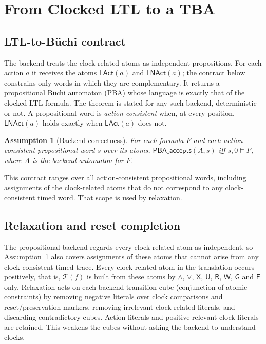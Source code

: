 \documentclass{ieeeaccess}
\newtheorem{assumption}[theorem]{Assumption}
\newcommand{\Until}{\mathbin{\mathsf{U}}}
\newcommand{\Release}{\mathbin{\mathsf{R}}}
\newcommand{\Next}{\mathsf{X}}
\newcommand{\Always}{\mathsf{G}}
\newcommand{\Eventually}{\mathsf{F}}
\newcommand{\WeakUntil}{\mathbin{\mathsf{W}}}
\newcommand{\T}{\mathcal{T}}
\begin{document}
\section{From Clocked LTL to a TBA}
\label{sec:tba-construction}
\subsection{LTL-to-B\"uchi contract}
The backend treats the clock-related atoms as independent propositions.
For each action $a$ it receives the atoms $\mathsf{LAct}(a)$ and
$\mathsf{LNAct}(a)$; the contract below constrains only words in which they
are complementary. It returns a propositional B\"uchi automaton
(PBA) whose language is exactly that of the clocked-LTL formula. The theorem is
stated for any such backend, deterministic or not. A propositional word is
\emph{action-consistent} when, at every position, $\mathsf{LNAct}(a)$ holds
exactly when $\mathsf{LAct}(a)$ does not.
\begin{assumption}[Backend correctness]
\label{ass:backend}
For each formula $F$ and each action-consistent propositional word $s$ over
its atoms, $\mathsf{PBA\_accepts}(A,s)$ iff $s,0\models F$, where $A$ is the
backend automaton for $F$.
\end{assumption}
This contract ranges over all action-consistent propositional words,
including assignments of the clock-related atoms that do not correspond to any
clock-consistent timed word. That scope is used by relaxation. 

\subsection{Relaxation and reset completion}
\label{sec:reset-completion}
The propositional backend regards every clock-related atom as independent,
so Assumption~\ref{ass:backend} also covers assignments of these atoms that
cannot arise from any clock-consistent timed trace. Every clock-related atom
in the translation occurs positively, that is, $\T(f)$ is built from these
atoms by $\land$, $\lor$, $\Next$, $\Until$, $\Release$, $\WeakUntil$,
$\Always$ and $\Eventually$ only. Relaxation acts on
each backend transition cube (conjunction of atomic constraints) by removing negative literals over clock
comparisons and reset/preservation markers, removing irrelevant
clock-related literals, and discarding contradictory cubes. Action literals
and positive relevant clock literals are retained. This weakens the cubes
without asking the backend to understand clocks.
\end{document}
